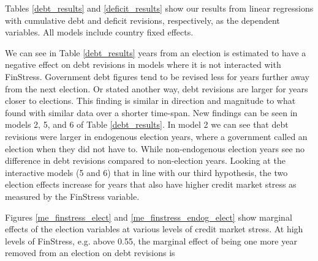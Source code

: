 \documentclass[]{article}
\begin{document}
Tables \ref{debt_results} and \ref{deficit_results} show our results from linear regressions with cumulative debt and deficit revisions, respectively, as the dependent variables. All models include country fixed effects.

We can see in Table \ref{debt_results} years from an election is estimated to have a negative effect on debt revisions in models where it is not interacted with FinStress. Government debt figures tend to be revised less for years further away from the next election. Or stated another way, debt revisions are larger for years closer to elections. This finding is similar in direction and magnitude to what \cite{DeCastro2013} found with similar data over a shorter time-span. New findings can be seen in models 2, 5, and 6 of Table \ref{debt_results}. In model 2 we can see that debt revisions were larger in endogenous election years, where a government called an election when they did not have to. While non-endogenous election years see no difference in debt revisions compared to non-election years. Looking at the interactive models (5 and 6) that in line with our third hypothesis, the two election effects increase for years that also have higher credit market stress as measured by the FinStress variable.

Figures \ref{me_finstress_elect} and \ref{me_finstress_endog_elect} show marginal effects of the election variables at various levels of credit market stress. At high levels of FinStress, e.g. above 0.55, the marginal effect of being one more year removed from an election on debt revisions is

\begin{landscape}
    
\end{landscape}

\begin{landscape}
    
\end{landscape}
\end{document}
